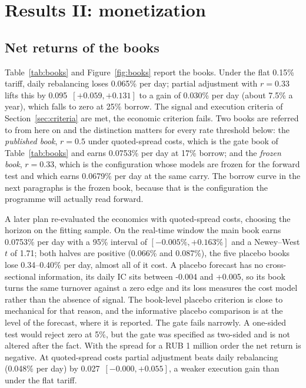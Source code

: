 \section{Results II: monetization}\label{sec:money}

\subsection{Net returns of the books}\label{sec:book}

Table~\ref{tab:books} and Figure~\ref{fig:books} report the books. Under the flat 0.15\% tariff, daily rebalancing loses 0.065\% per day; partial adjustment with $r=0.33$ lifts this by 0.095\pp\ $[+0.059,+0.131]$ to a gain of 0.030\% per day (about 7.5\% a year), which falls to zero at 25\% borrow. The signal and execution criteria of Section~\ref{sec:criteria} are met, the economic criterion fails. Two books are referred to from here on and the distinction matters for every rate threshold below: the \emph{published book}, $r=0.5$ under quoted-spread costs, which is the gate book of Table~\ref{tab:books} and earns 0.0753\% per day at 17\% borrow; and the \emph{frozen book}, $r=0.33$, which is the configuration whose models are frozen for the forward test and which earns 0.0679\% per day at the same carry. The borrow curve in the next paragraphs is the frozen book, because that is the configuration the programme will actually read forward.

A later plan re-evaluated the economics with quoted-spread costs, choosing the horizon on the fitting sample. On the real-time window the main book earns 0.0753\% per day with a 95\% interval of $[-0.005\%,+0.163\%]$ and a Newey--West $t$ of 1.71; both halves are positive (0.066\% and 0.087\%), the five placebo books lose 0.34--0.40\% per day, almost all of it cost. A placebo forecast has no cross-sectional information, its daily IC sits between -0.004 and +0.005, so its book turns the same turnover against a zero edge and its loss measures the cost model rather than the absence of signal. The book-level placebo criterion is close to mechanical for that reason, and the informative placebo comparison is at the level of the forecast, where it is reported. The gate fails narrowly. A one-sided test would reject zero at 5\%, but the gate was specified as two-sided and is not altered after the fact. With the spread for a RUB 1 million order the net return is negative. At quoted-spread costs partial adjustment beats daily rebalancing (0.048\% per day) by 0.027\pp\ $[-0.000,+0.055]$, a weaker execution gain than under the flat tariff.

